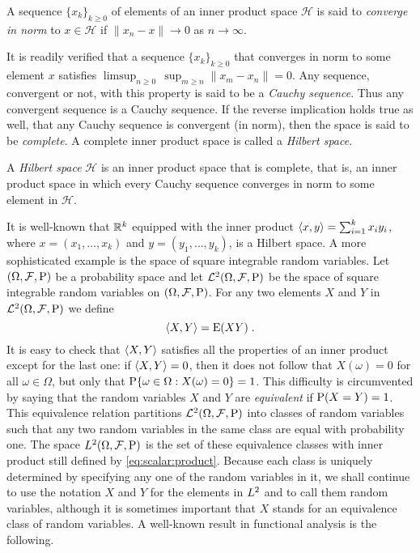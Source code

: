 \begin{defi}
A sequence $\{ x_k \}_{k \geq 0}$ of elements of an
inner product space $\mathcal{H}$ is said to \emph{converge in norm}
to $x \in \mathcal{H}$ if
$\| x_n - x \| \to 0$ as $n \to \infty$.
\end{defi}

It is readily verified that a sequence $\{ x_k \}_{k \geq 0}$
that converges in norm to some element $x$ satisfies
$\limsup_{n \geq 0} \, \sup_{m \geq n} \| x_m-x_n\| = 0$.
Any sequence, convergent or not, with this property is
said to be a \emph{Cauchy sequence}. Thus any convergent sequence is
a Cauchy sequence. If the reverse implication holds true as well,
that any Cauchy sequence is convergent (in norm), then the space
is said to be \emph{complete}.
A complete inner product space is called a \emph{Hilbert space}.

\begin{defi}
   A \emph{Hilbert space} $\mathcal{H}$ is an inner
  product space that is complete, that is, an inner product space in which
  every Cauchy sequence converges in norm to some element in $\mathcal{H}$.
\end{defi}

It is well-known that $\mathbb{R}^k$ equipped with the inner product
$\langle x, y \rangle = \sum_{i=1}^k x_i y_i$,
where $x= (x_1, \dotsc, x_k)$ and $y = (y_1, \dotsc, y_k)$,
is a Hilbert space. A more sophisticated example is the space of
square integrable random variables.
Let $(\Omega,\mathcal{F},\operatorname{P})$ be a probability space and let
$\mathcal{L}^2(\Omega,\mathcal{F},\operatorname{P})$ be the space
of square integrable random variables on $(\Omega,\mathcal{F},\operatorname{P})$.
For any two elements $X$ and $Y$ in $\mathcal{L}^2(\Omega,\mathcal{F},\operatorname{P})$
we define
\begin{equation}
\label{eq:scalar:product}
\langle X, Y \rangle = \operatorname{E}( X Y) \; .
\end{equation}
It is easy to check that $\langle X, Y \rangle$ satisfies all the properties
of an inner product except for the last one:
if $\langle X, Y \rangle= 0$, then it does not follow that $X(\omega)= 0$
for all $\omega \in \Omega$, but only that
$\operatorname{P} \{ \omega \in \Omega: X(\omega)= 0 \} = 1$.
This difficulty is circumvented by saying that
the random variables $X$ and $Y$ are \emph{equivalent} if
$\operatorname{P} ( X = Y) = 1$. This equivalence relation partitions
$\mathcal{L}^2(\Omega,\mathcal{F},\operatorname{P})$ into classes
of random variables such that any two random variables in the same
class are equal with probability one.
The space $L^2(\Omega,\mathcal{F},\operatorname{P})$ is the set of these
equivalence classes with inner product still defined by
\eqref{eq:scalar:product}. Because each class is uniquely determined
by specifying any one of the random variables in it,
we shall continue to use the notation $X$ and $Y$ for the elements in
$L^2$ and to call them random variables, although it is sometimes
important that $X$ stands for an equivalence class of random variables.
A well-known result in functional analysis is the following.

